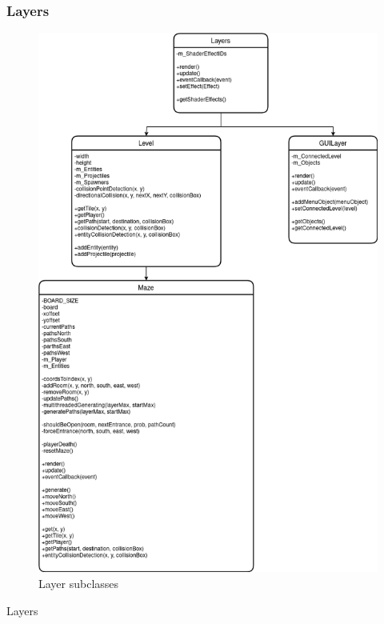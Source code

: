 \documentclass{article}
\begin{document}
            \subsubsection{Layers}
                \begin{figure}[hbt!]
                    \centerline{\includegraphics[scale=0.5]{img/Classes/Layers.png}}
                    \caption{Layer subclasses}
                    \label{fig}
                \end{figure}
                Layers
\end{document}
